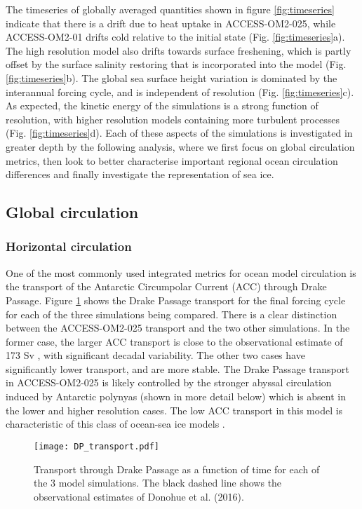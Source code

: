 \documentclass[gmd, manuscript]{copernicus}
\begin{document}
The timeseries of globally averaged quantities shown in figure \ref{fig:timeseries} indicate that there is a drift due to  heat uptake in ACCESS-OM2-025, while ACCESS-OM2-01 drifts cold relative to the initial state (Fig. \ref{fig:timeseries}a).
The high resolution model also drifts towards surface freshening, which is partly offset by the surface salinity restoring that is incorporated into the model (Fig. \ref{fig:timeseries}b).
The global sea surface height variation is dominated by the interannual forcing cycle, and is independent of resolution (Fig. \ref{fig:timeseries}c). 
As expected, the kinetic energy of the simulations is a strong function of resolution, with higher resolution models containing more turbulent processes (Fig. \ref{fig:timeseries}d).
Each of these aspects of the simulations is investigated in greater depth by the following analysis, where we first focus on global circulation metrics, then look to better characterise important regional ocean circulation differences and finally investigate the representation of sea ice.

\subsection{Global circulation}

\subsubsection{Horizontal circulation}
One of the most commonly used integrated metrics for ocean model circulation is the transport of the Antarctic Circumpolar Current (ACC) through Drake Passage.
Figure \ref{fig:drake} shows the Drake Passage transport for the final forcing cycle for each of the three simulations being compared.
There is a clear distinction between the ACCESS-OM2-025 transport and the two other simulations.
In the former case, the larger ACC transport is close to the observational estimate of 173 Sv \citep[black dashed line; ][]{Donohue2016}, with significant decadal variability. 
The other two cases have significantly lower transport, and are more stable. 
The  Drake Passage transport in ACCESS-OM2-025 is likely controlled by the stronger abyssal circulation induced by Antarctic polynyas (shown in more detail below) which is absent in the  lower and higher resolution cases.
The low ACC transport in this model is characteristic of this class of ocean-sea ice models \citep[e.g.][]{Farneti2015}.

\begin{figure}[t]
\texttt{[image: DP\_transport.pdf]}
\caption{Transport through Drake Passage as a function of time for each of the 3 model simulations. The black dashed line shows the observational estimates of Donohue et al. (2016). \label{fig:drake}}
\end{figure}
\end{document}
